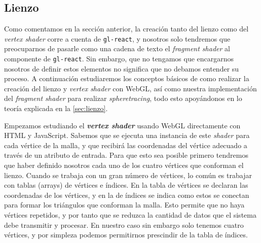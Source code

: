 \subsection{Lienzo}\label{sec:lienzoImplem}
Como comentamos en la sección anterior, la creación tanto del lienzo como del \textit{vertex shader} corre a cuenta de \texttt{gl-react}, y nosotros solo tendremos que preocuparnos de pasarle como una cadena de texto el \textit{fragment shader} al componente de \texttt{gl-react}. Sin embargo, que no tengamos que encargarnos nosotros de definir estos elementos no significa que no debamos entender su proceso. A continuación estudiaremos los conceptos básicos de como realizar la creación del lienzo y \textit{vertex shader} \cite{webgl} con WebGL, así como nuestra implementación del \textit{fragment shader} para realizar \textit{spheretracing}, todo esto apoyándonos en lo teoría explicada en la \autoref{sec:lienzo}.\newline



Empezamos estudiando el \textbf{\textit{vertex shader}} usando WebGL directamente con HTML y JavaScript. Sabemos que se ejecuta una instancia de este \textit{shader} para cada vértice de la malla, y que recibirá las coordenadas del vértice adecuado a través de un atributo de entrada. Para que esto sea posible primero tendremos que haber definido nosotros cada uno de los cuatro vértices que conforman el lienzo. Cuando se trabaja con un gran número de vértices, lo común es trabajar con tablas (arrays) de vértices e índices. En la tabla de vértices se declaran las coordenadas de los vértices, y en la de índices se indica como estos se conectan para formar los triángulos que conforman la malla. Esto permite que no haya vértices repetidos, y por tanto que se reduzca la cantidad de datos que el sistema debe transmitir y procesar. En nuestro caso sin embargo solo tenemos cuatro vértices, y por simpleza podemos permitirnos prescindir de la tabla de índices.\newline

